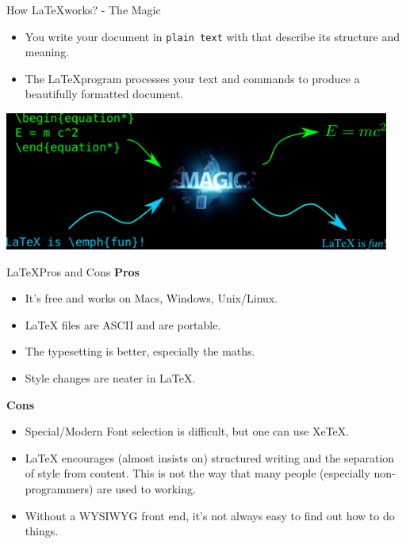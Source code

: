\documentclass[10pt,times]{beamer}
\begin{document}
\begin{frame}{How \LaTeX works? - The Magic}
\begin{itemize}
\item You write your document in \texttt{plain text} with  that
describe its structure and meaning.
\item The \LaTeX program processes your text and commands to produce a
beautifully formatted document.
\end{itemize}

\centering
\includegraphics[width=0.95\textwidth]{figs/magic.png}
\end{frame}



\begin{frame}{\LaTeX Pros and Cons}
\textbf{Pros}
\begin{itemize}
\item    It's free and works on Macs, Windows, Unix/Linux.
\item    LaTeX files are ASCII and are portable.
\item    The typesetting is better, especially the maths.
\item    Style changes are neater in LaTeX. 
\end{itemize}
\textbf{Cons}
\begin{itemize}
\item    Special/Modern Font selection is difficult, but one can use XeTeX.
\item    LaTeX encourages (almost insists on) structured writing and the 
separation of style from content. This is not the way that many people 
(especially non-programmers) are used to working.
\item    Without a WYSIWYG front end, it's not always easy to find out how to 
do things.
\end{itemize}
\end{frame}
\end{document}
